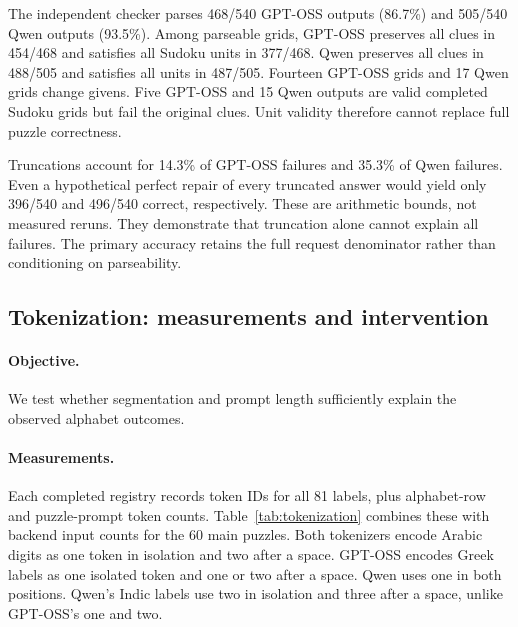 \documentclass[11pt]{article}
\begin{document}
The independent checker parses 468/540 GPT-OSS outputs (86.7\%) and 505/540 Qwen outputs (93.5\%). Among parseable grids, GPT-OSS preserves all clues in 454/468 and satisfies all Sudoku units in 377/468. Qwen preserves all clues in 488/505 and satisfies all units in 487/505. Fourteen GPT-OSS grids and 17 Qwen grids change givens. Five GPT-OSS and 15 Qwen outputs are valid completed Sudoku grids but fail the original clues. Unit validity therefore cannot replace full puzzle correctness.

Truncations account for 14.3\% of GPT-OSS failures and 35.3\% of Qwen failures. Even a hypothetical perfect repair of every truncated answer would yield only 396/540 and 496/540 correct, respectively. These are arithmetic bounds, not measured reruns. They demonstrate that truncation alone cannot explain all failures. The primary accuracy retains the full request denominator rather than conditioning on parseability.


\subsection{Tokenization: measurements and intervention}\label{sec:tokenization}
\paragraph{Objective.} We test whether segmentation and prompt length sufficiently explain the observed alphabet outcomes.
\paragraph{Measurements.} Each completed registry records token IDs for all 81 labels, plus alphabet-row and puzzle-prompt token counts. Table~\ref{tab:tokenization} combines these with backend input counts for the 60 main puzzles. Both tokenizers encode Arabic digits as one token in isolation and two after a space. GPT-OSS encodes Greek labels as one isolated token and one or two after a space. Qwen uses one in both positions. Qwen's Indic labels use two in isolation and three after a space, unlike GPT-OSS's one and two.

\begin{table}[t]
\centering\small

\caption{Measured token counts and main outcomes for both models. Label columns give ranges over nine labels. Alphabet row is the complete space-separated list. Mean input includes chat-template overhead and averages 60 main puzzles. Registry user-message counts exclude that overhead.}
\label{tab:tokenization}
\end{table}
\end{document}
